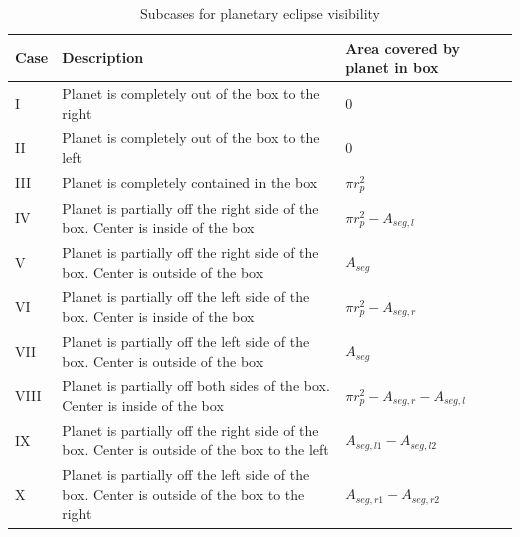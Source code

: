 \begin{table}
	\caption{Subcases for planetary eclipse visibility}
	\label{cases}
	\begin{center}
	\renewcommand{\arraystretch}{1.2}
		\begin{tabular}{| m{} | m{} | m{} |} %
			\hline
			\textbf{Case}    & \textbf{Description} & \textbf{Area covered by planet in box}\\ %
			\hline%
			I      &   Planet is completely out of the box to the right                                                                      & 0                                                           \\ \hline
			II     &   Planet is completely out of the box to the left                                                                         & 0                                                           \\ \hline
			III    &   Planet is completely contained in the box                                                                              & $\pi r_p^2$                                         \\ \hline
			IV    &   Planet is partially off the right side of the box. Center is inside of the box                       & $\pi r_p^2 - A_{seg,l}$                     \\ \hline
			V     &   Planet is partially off the right side of the box. Center is outside of the box                     & $A_{seg}$                                          \\ \hline
			VI    &   Planet is partially off the left side of the box. Center is inside of the box                          & $\pi r_p^2 - A_{seg,r}$                     \\ \hline
			VII   &   Planet is partially off the left side of the box. Center is outside of the box                        & $A_{seg}$                                          \\ \hline
			VIII  &   Planet is partially off both sides of the box. Center is inside of the box                            & $\pi r_p^2 - A_{seg,r} - A_{seg,l}$ \\ \hline
			IX    &   Planet is partially off the right side of the box. Center is outside of the box to the left & $A_{seg,l1} - A_{seg,l2}$                \\ \hline
			X     &   Planet is partially off the left side of the box. Center is outside of the box to the right    & $A_{seg,r1} - A_{seg,r2}$               \\ \hline
		\end{tabular}
	\end{center}
\end{table}

